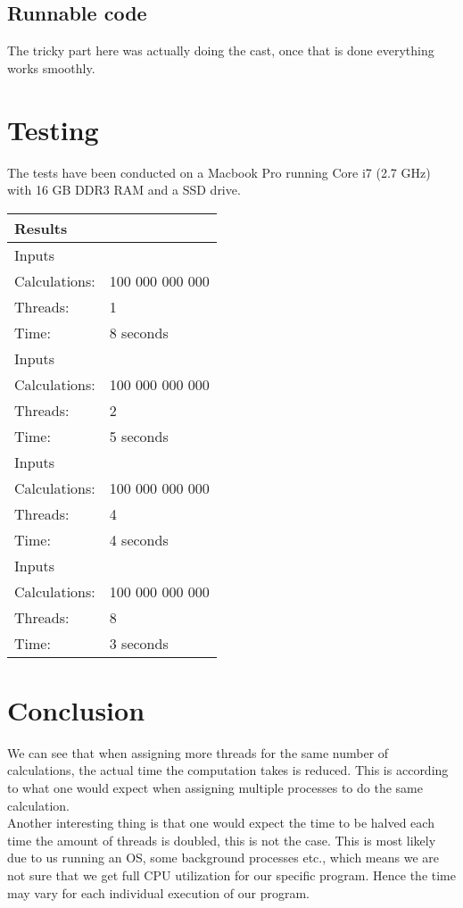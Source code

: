 

\subsection{Runnable code}
The tricky part here was actually doing the cast, once that is done everything works smoothly.\\



\section{Testing}
The tests have been conducted on a Macbook Pro running Core i7 (2.7 GHz) with 16 GB DDR3 RAM and a SSD drive.

\newcommand{\rowhead}[1] {
\multicolumn{2}{l}{#1}\\
\hline
}

\newcommand{\row}[3] {
\hline
\rowcolor{gr1}
Inputs&\\
\hline \hline
\rowcolor{gr2}
Calculations: & #1 \\
\hline
\rowcolor{gr2}
Threads: & #2 \\
\hline
\rowcolor{gr2}
Time: & #3 \\
\hline \hline
}

\newcommand{\botrow}[3] {
\hline
\rowcolor{gr1}
Inputs&\\
\hline \hline
\rowcolor{gr2}
N = & #1 \\
\hline
\rowcolor{gr2}
Threads: & #2 \\
\hline
\rowcolor{gr2}
Time: & #3 \\
\hline
}

\begin{table}[ht]
\begin{tabular}{| p{} | p{} |}
\rowhead{Results}
\row{100 000 000 000}{1}{8 seconds}
\row{100 000 000 000}{2}{5 seconds}
\row{100 000 000 000}{4}{4 seconds}
\row{100 000 000 000}{8}{3 seconds}
\end{tabular}
\end{table}

\section{Conclusion}
We can see that when assigning more threads for the same number of calculations, the actual time the computation takes is reduced.
This is according to what one would expect when assigning multiple processes to do the same calculation.\\

Another interesting thing is that one would expect the time to be halved each time the amount of threads is doubled, this is not the case. This is most likely due to us running an OS, some background processes etc., which means we are not sure that we get full CPU utilization for our specific program. Hence the time may vary for each individual execution of our program.